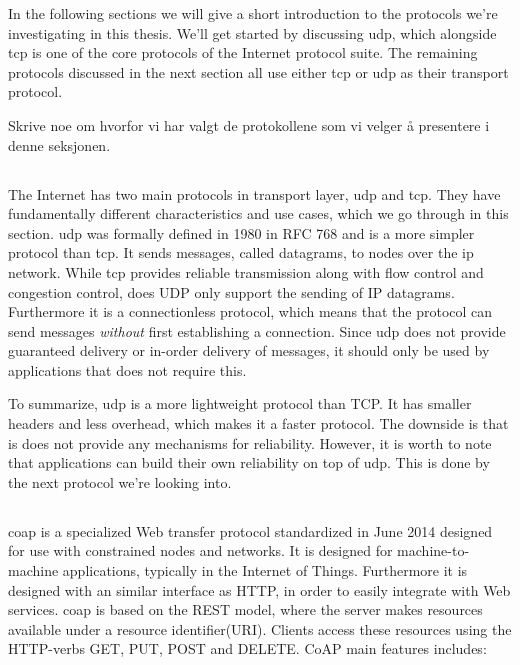 In the following sections we will give a short introduction to the protocols
we're investigating in this thesis. We'll get started by discussing \gls{udp},
which alongside \gls{tcp} is one of the core protocols of the Internet protocol
suite. The remaining protocols discussed in the next section all use either
\gls{tcp} or \gls{udp} as their transport protocol.

Skrive noe om hvorfor vi har valgt de protokollene som vi velger å presentere i denne seksjonen.

\subsection{}

The Internet has two main protocols in transport layer, \gls{udp} and \gls{tcp}.
They have fundamentally different characteristics and use cases, which we go
through in this section. \gls{udp} was formally defined in 1980 in RFC
768\cite{rfc-udp} and is a more simpler protocol than \gls{tcp}. It sends
messages, called datagrams, to nodes over the \gls{ip} network. While \gls{tcp}
provides reliable transmission along with flow control and congestion control,
does UDP only support the sending of IP datagrams. Furthermore it is a connectionless
protocol, which means that the protocol can send messages \textit{without} first
establishing a connection. Since \gls{udp} does not provide guaranteed delivery
or in-order delivery of messages, it should only be used by applications that
does not require this.

To summarize, \gls{udp} is a more lightweight protocol than TCP. It has smaller
headers and less overhead, which makes it a faster protocol. The downside is that
is does not provide any mechanisms for reliability. However, it is worth to note
that applications can build their own reliability on top of \gls{udp}. This is
done by the next protocol we're looking into.

\subsection{}

\gls{coap} is a specialized Web transfer protocol standardized in June 2014
designed for use with constrained nodes and  networks\cite{rfc-7252}. It is
designed for machine-to-machine applications, typically in the Internet of
Things. Furthermore it is designed with an similar interface as HTTP, in order
to easily integrate with Web services. \gls{coap} is based on the REST model,
where the server makes resources available  under a resource identifier(URI).
Clients access these resources using the HTTP-verbs GET, PUT, POST and DELETE.
CoAP main features includes:

